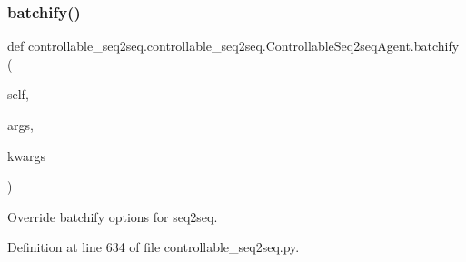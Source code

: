 \subsubsection{\texorpdfstring{batchify()}{batchify()}}
{\footnotesize\ttfamily def controllable\+\_\+seq2seq.\+controllable\+\_\+seq2seq.\+Controllable\+Seq2seq\+Agent.\+batchify (\begin{DoxyParamCaption}\item[{}]{self,  }\item[{}]{args,  }\item[{}]{kwargs }\end{DoxyParamCaption})}

\begin{DoxyVerb}Override batchify options for seq2seq.\end{DoxyVerb}
 

Definition at line 634 of file controllable\+\_\+seq2seq.\+py.



